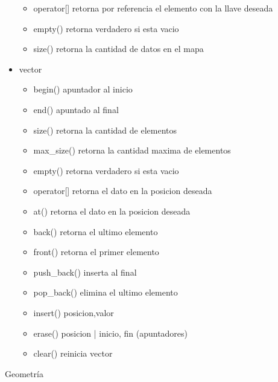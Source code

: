 \documentclass[a4paper,spanish,10pt]{article}
\begin{document}
\begin{multicols}{2}
\begin{itemize}
{\begin{itemize}
				\item operator[] retorna por referencia el elemento con la llave deseada
				\item empty() retorna verdadero si esta vacio
				\item size() retorna la cantidad de datos en el mapa
			\end{itemize}
		}
		\item{ vector
			\begin{itemize}
				\item begin() apuntador al inicio
				\item end() apuntado al final
				\item size() retorna la cantidad de elementos
				\item max\_size() retorna la cantidad maxima de elementos
				\item empty() retorna verdadero si esta vacio
				\item operator[] retorna el dato en la posicion deseada
				\item at() retorna el dato en la posicion deseada
				\item back() retorna el ultimo elemento
				\item front() retorna el primer elemento
				\item push\_back() inserta al final
				\item pop\_back() elimina el ultimo elemento
				\item insert() posicion,valor
				\item erase() posicion | inicio, fin (apuntadores)
				\item clear() reinicia vector
			\end{itemize}
		}
	\end{itemize}
	\end{multicols}
	\newpage
		Geometr\'ia
\end{document}
